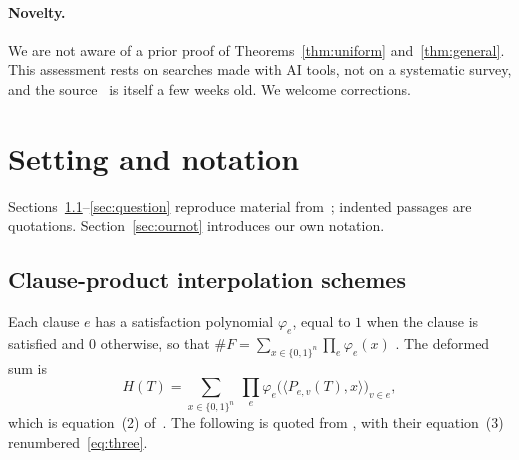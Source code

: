 \documentclass[11pt,a4paper]{article}
\theoremstyle{definition}
\theoremstyle{remark}
\begin{document}
\paragraph{Novelty.} We are not aware of a prior proof of
Theorems~\ref{thm:uniform} and~\ref{thm:general}. This assessment rests on searches made
with AI tools, not on a systematic survey, and the source~\cite{DL} is itself a few weeks
old. We welcome corrections.

\section{Setting and notation}\label{sec:setting}

Sections~\ref{sec:def}--\ref{sec:question} reproduce material from~\cite{DL}; indented
passages are quotations. Section~\ref{sec:ournot} introduces our own notation.

\subsection{Clause-product interpolation schemes}\label{sec:def}

Each clause $e$ has a satisfaction polynomial $\varphi_e$, equal to $1$ when the clause is
satisfied and $0$ otherwise, so that
$\#F=\sum_{x\in\{0,1\}^n}\prod_e\varphi_e(x)$ \cite[(1)]{DL}. The deformed sum is
\begin{equation}\tag{DL.2}\label{eq:H}
H(T)=\sum_{x\in\{0,1\}^n}\ \prod_e\varphi_e\bigl(\langle P_{e,v}(T),x\rangle\bigr)_{v\in e},
\end{equation}
which is equation~(2) of~\cite{DL}. The following is quoted from \cite[Section~5]{DL}, with
their equation~(3) renumbered~\eqref{eq:three}.
\end{document}

